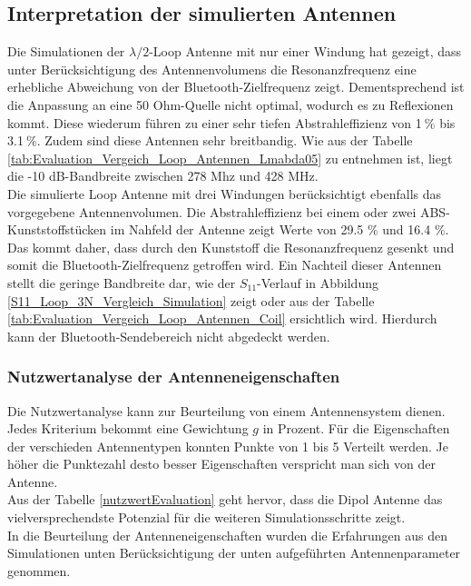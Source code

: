 \subsection{Interpretation der simulierten Antennen}
Die Simulationen der $\lambda/2$-Loop Antenne mit nur einer Windung hat gezeigt, dass unter Berücksichtigung des Antennenvolumens die Resonanzfrequenz eine erhebliche Abweichung von der Bluetooth-Zielfrequenz zeigt. Dementsprechend ist die Anpassung an eine 50 Ohm-Quelle nicht optimal, wodurch es zu Reflexionen kommt. Diese wiederum führen zu einer sehr tiefen Abstrahleffizienz von 1$\ \% $ bis 3.1$\ \%$. Zudem sind diese Antennen sehr breitbandig. Wie aus der Tabelle \ref{tab:Evaluation_Vergeich_Loop_Antennen_Lmabda05} zu entnehmen ist, liegt die -10 dB-Bandbreite zwischen 278 Mhz und 428 MHz.\\
Die simulierte Loop Antenne mit drei Windungen berücksichtigt ebenfalls das vorgegebene Antennenvolumen. Die Abstrahleffizienz bei einem oder zwei ABS-Kunststoffstücken im Nahfeld der Antenne zeigt Werte von 29.5 $\%$ und 16.4 $\%$. Das kommt daher, dass durch den Kunststoff die Resonanzfrequenz gesenkt und somit die Bluetooth-Zielfrequenz getroffen wird. Ein Nachteil dieser Antennen stellt die geringe Bandbreite dar, wie der $S_{11}$-Verlauf in Abbildung \ref{S11_Loop_3N_Vergleich_Simulation} zeigt oder aus der Tabelle \ref{tab:Evaluation_Vergeich_Loop_Antennen_Coil} ersichtlich wird. Hierdurch kann der Bluetooth-Sendebereich nicht abgedeckt werden.

\newpage
\subsubsection{Nutzwertanalyse der Antenneneigenschaften }
Die Nutzwertanalyse kann zur Beurteilung von einem Antennensystem dienen. Jedes Kriterium bekommt eine Gewichtung $g$ in Prozent. Für die Eigenschaften der verschieden Antennentypen konnten Punkte von 1 bis 5 Verteilt werden. Je höher die Punktezahl desto besser Eigenschaften verspricht man sich von der Antenne.\\
Aus der Tabelle \ref{nutzwertEvaluation} geht hervor, dass die Dipol Antenne das vielversprechendste Potenzial für die weiteren Simulationsschritte zeigt.\\
In die Beurteilung der Antenneneigenschaften wurden die Erfahrungen aus den Simulationen unten Berücksichtigung der unten aufgeführten Antennenparameter genommen.

